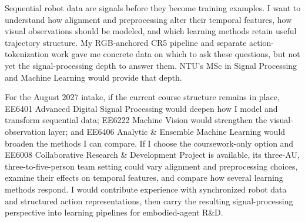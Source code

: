 Sequential robot data are signals before they become training examples. I want to understand how alignment and preprocessing alter their temporal features, how visual observations should be modeled, and which learning methods retain useful trajectory structure. My RGB-anchored CR5 pipeline and separate action-tokenization work gave me concrete data on which to ask these questions, but not yet the signal-processing depth to answer them. NTU's MSc in Signal Processing and Machine Learning would provide that depth.

For the August 2027 intake, if the current course structure remains in place, EE6401 Advanced Digital Signal Processing would deepen how I model and transform sequential data; EE6222 Machine Vision would strengthen the visual-observation layer; and EE6406 Analytic \& Ensemble Machine Learning would broaden the methods I can compare. If I choose the coursework-only option and EE6008 Collaborative Research \& Development Project is available, its three-AU, three-to-five-person team setting could vary alignment and preprocessing choices, examine their effects on temporal features, and compare how several learning methods respond. I would contribute experience with synchronized robot data and structured action representations, then carry the resulting signal-processing perspective into learning pipelines for embodied-agent R\&D.
